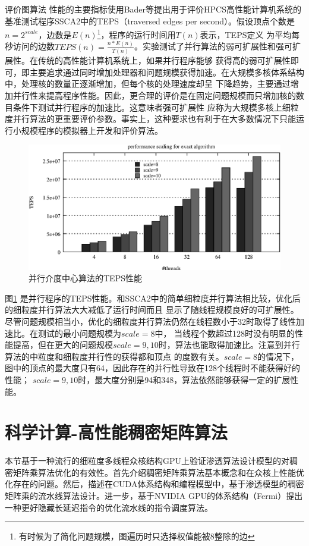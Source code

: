 \begin{flushleft}
评价图算法
性能的主要指标使用Bader等提出用于评价HPCS高性能计算机系统的基准测试程序SSCA2中的TEPS（traversed edges per
second）。假设顶点个数是$n=2^{scale}$，边数是$E(n)$\footnote{有时候为了简化问题规模，图遍历时只选择权值能被8整除的边}，程序的运行时间用$T(n)$表示，TEPS定义
为平均每秒访问的边数$TEPS(n)=\frac{n*E(n)}{T(n)}$。实验测试了并行算法的弱可扩展性和强可扩展性。在传统的高性能计算机系统上，如果并行程序能够
获得高的弱可扩展性即可，即主要追求通过同时增加处理器和问题规模获得加速。在大规模多核体系结构中，处理核的数量正逐渐增加，但每个核的处理速度却呈
下降趋势，主要通过增加并行性来提高程序性能。因此，更合理的评价是在固定问题规模而只增加核的数目条件下测试并行程序的加速比。这意味者强可扩展性
应称为大规模多核上细粒度并行算法的更重要评价参数。事实上，这种要求也有利于在大多数情况下只能运行小规模程序的模拟器上开发和评价算法。
\begin{figure}[htbp]
	\begin{center}
		\includegraphics[scale=0.6]{Img/Chap_Algorithm/teps}
		\caption{并行介度中心算法的TEPS性能} \label{fig:teps}
	\end{center}
\end{figure}

图\ref{fig:teps}
是并行程序的TEPS性能。和SSCA2中的简单细粒度并行算法相比较，优化后的细粒度并行算法大大减低了运行时间而且
显示了随线程规模良好的可扩展性。尽管问题规模相当小，优化的细粒度并行算法仍然在线程数小于32时取得了线性加速比。在测试的最小问题规模为$scale=8$中，
当线程个数超过128时没有明显的性能提高，但在更大的问题规模$scale=9,10$时，算法也能取得加速比。注意到并行算法的中粒度和细粒度并行性的获得都和顶点
的度数有关。$scale=8$的情况下，图中的顶点的最大度只有64，因此存在的并行性导致在128个线程时不能获得好的性能； $scale = 9,
10$时，最大度分别是94和348，算法依然能够获得一定的扩展性能。


\section{科学计算-高性能稠密矩阵算法}\label{sec:PM_mm}
本节基于一种流行的细粒度多线程众核结构GPU上验证渗透算法设计模型的对稠密矩阵乘算法优化的有效性。首先介绍稠密矩阵乘算法基本概念和在众核上性能优化存在的问题。然后，描述在CUDA体系结构和编程模型中，基于渗透模型的稠密矩阵乘的流水线算法设计。进一步，基于NVIDIA GPU的体系结构（Fermi）提出一种更好隐藏长延迟指令的优化流水线的指令调度算法。


\end{flushleft}
